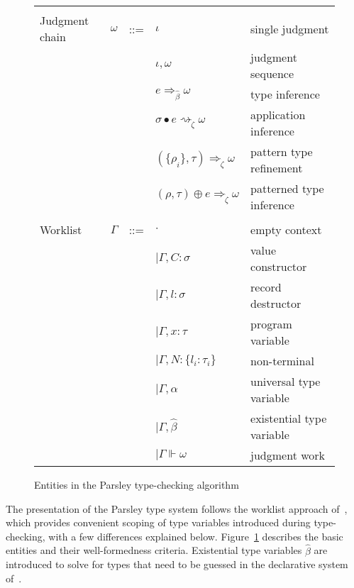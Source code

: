 \documentclass[letterpaper]{article}
\newcommand{\utv}{\alpha}             %
\newcommand{\etv}{{\widehat{\beta}}}  %
\newcommand{\stv}{{\grave{\zeta}}}    %
\begin{document}
\begin{figure}
\begin{tabular}{l c l l l}
                          &          &     &                                   & \\
    Judgment chain        & $\omega$ & ::= & $ \iota $                         & single judgment \\
                          &          &     & $ \iota, \omega $                 & judgment sequence \\
                          &          &     & $ e\Rightarrow_\etv\omega $       & type inference \\
                          &          &     & $ \sigma\bullet e\rightsquigarrow_\stv\omega $  & application inference \\
                          &          &     & $ (\{\rho_i\},\tau)\Rightarrow_\stv\omega $     & pattern type refinement \\
                          &          &     & $ (\rho,\tau)\oplus e\Rightarrow_\stv\omega $   & patterned type inference \\
                          &          &     &                                   & \\
    Worklist              & $\Gamma$ & ::= & $ \cdot $                         & empty context \\
                          &          &     & $ \mid\Gamma, C: \sigma$          & value constructor \\
                          &          &     & $ \mid\Gamma, l: \sigma$          & record destructor \\
                          &          &     & $ \mid\Gamma, x: \tau $           & program variable \\
                          &          &     & $ \mid\Gamma, N: \{l_i:\tau_i\} $ & non-terminal \\
                          &          &     & $ \mid\Gamma, \utv $              & universal type variable \\
                          &          &     & $ \mid\Gamma, \etv  $             & existential type variable\\
                          &          &     & $ \mid\Gamma\Vdash\omega $        & judgment work \\

  \end{tabular}
  \caption{Entities in the Parsley type-checking algorithm}
  \label{f:ts:defs}
\end{figure}

The presentation of the Parsley type system follows the worklist
approach of~\cite{zhao2018,zhao19:bidir}, which provides convenient
scoping of type variables introduced during type-checking, with a few
differences explained below.  Figure~\ref{f:ts:defs}
describes the basic entities and their well-formedness criteria.
Existential type variables $\etv$ are introduced to solve for types
that need to be guessed in the declarative system
of~\cite{Dunfield13:bidir}.
\end{document}
